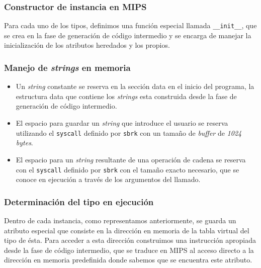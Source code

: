 \documentclass[a4paper,10pt,twocolumn]{article}
\begin{document}
\subsubsection{Constructor de instancia en MIPS}

Para cada uno de los tipos, definimos una función especial llamada \lstinline|__init__|, que se crea en la fase de generación de código intermedio y se encarga de manejar la inicialización de los atributos heredados y los propios. 

\subsubsection{Manejo de \textit{strings} en memoria}

\begin{itemize}
	\item Un \textit{string} constante se reserva en la sección data en el inicio del programa, la estructura data que contiene los \textit{strings} esta construida desde la fase de generación de código intermedio.
	\item El espacio para guardar un \textit{string} que introduce el usuario se reserva utilizando el \lstinline|syscall| definido por \lstinline|sbrk| con un tamaño de \textit{buffer} de \textit{1024 bytes}. 
	\item El espacio para un \textit{string} resultante de una operación de cadena se reserva con el \lstinline|syscall| definido por \lstinline|sbrk| con el tamaño exacto necesario, que se conoce en ejecución a través de los argumentos del llamado.  
\end{itemize}

\subsubsection{Determinación del tipo en ejecución}

Dentro de cada instancia, como representamos anteriormente, se guarda un atributo especial que consiste en la dirección en memoria de la tabla virtual del tipo de ésta. Para acceder a esta dirección construimos una instrucción apropiada desde la fase de código intermedio, que se traduce en MIPS al acceso directo a la dirección en memoria predefinida donde sabemos que se encuentra este atributo. 

\label{end}
\end{document}

